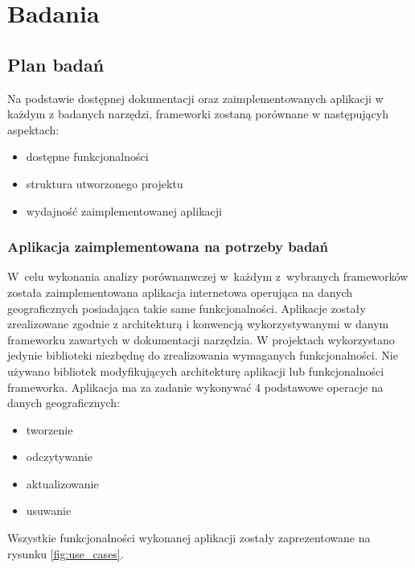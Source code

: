 \documentclass[printmode]{mgr}
\begin{document}
\chapter{Badania}

\section{Plan badań}

Na podstawie dostępnej dokumentacji oraz zaimplementowanych aplikacji w każdym z badanych narzędzi, frameworki zostaną porównane w następującyh aspektach:
\begin{itemize}
  \item dostępne funkcjonalności
  \item struktura utworzonego projektu
  \item wydajność zaimplementowanej aplikacji
\end{itemize}


\subsection{Aplikacja zaimplementowana na potrzeby badań}

W~celu wykonania analizy porównanwczej w~każdym z~wybranych frameworków została zaimplementowana aplikacja internetowa operująca na danych geograficznych posiadająca takie same funkcjonalności. Aplikacje zostały zrealizowane zgodnie z architekturą i konwencją wykorzystywanymi w danym frameworku zawartych w dokumentacji narzędzia. W projektach wykorzystano jedynie biblioteki niezbędnę do zrealizowania wymaganych funkcjonalności. Nie używano bibliotek modyfikujących architekturę aplikacji lub funkcjonalności frameworka.
Aplikacja ma za zadanie wykonywać 4 podstawowe operacje na danych geograficznych:
\begin{itemize}
  \item tworzenie
  \item odczytywanie
  \item aktualizowanie
  \item usuwanie
\end{itemize}

Wszystkie funkcjonalności wykonanej aplikacji zostały zaprezentowane na rysunku \ref{fig:use_cases}.
\end{document}
